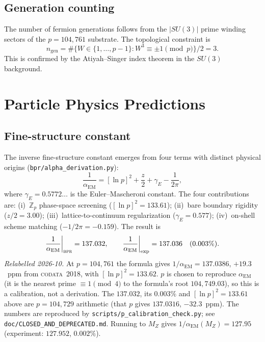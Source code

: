 \documentclass[aps,prd,twocolumn,superscriptaddress,longbibliography,nofootinbib]{revtex4-2}
\newcommand{\Zp}{\mathbb{Z}_p}
\newcommand{\alphaEM}{\alpha_{\mathrm{EM}}}
\newcommand{\MZ}{M_Z}
\newcommand{\bpr}{\textsc{bpr}}
\begin{document}
\subsection{Generation counting}

The number of fermion generations follows from the $|SU(3)|$ prime winding
sectors of the $p = 104{,}761$ substrate.  The topological constraint is
\begin{equation}
n_{\mathrm{gen}} = \#\bigl\{W \in \{1,\ldots,p-1\} :
  W^3 \equiv \pm 1 \pmod{p}\bigr\} / 2 = 3.
\label{eq:ngen}
\end{equation}
This is confirmed by the Atiyah--Singer index theorem in the $SU(3)$ background.


\section{Particle Physics Predictions}
\label{sec:particle}

\subsection{Fine-structure constant}

The inverse fine-structure constant emerges from four terms with distinct
physical origins (\texttt{bpr/alpha\_derivation.py}):
\begin{equation}
\frac{1}{\alphaEM} = [\ln p]^2 + \frac{z}{2} + \gamma_E - \frac{1}{2\pi},
\label{eq:alpha}
\end{equation}
where $\gamma_E = 0.5772\ldots$ is the Euler--Mascheroni constant.
The four contributions are: (i)~$\Zp$ phase-space screening
($[\ln p]^2 = 133.61$); (ii)~bare boundary rigidity ($z/2 = 3.00$);
(iii)~lattice-to-continuum regularization ($\gamma_E = 0.577$);
(iv)~on-shell scheme matching ($-1/2\pi = -0.159$).  The result is
\begin{equation}
\frac{1}{\alphaEM}\bigg|_{\bpr} = 137.032, \qquad
\frac{1}{\alphaEM}\bigg|_{\mathrm{exp}} = 137.036 \quad (0.003\%).
\end{equation}
\textit{Relabelled 2026-10.}  At $p = 104{,}761$ the formula gives
$1/\alphaEM = 137.0386$, $+19.3$~ppm from \textsc{codata}~2018, with
$[\ln p]^2 = 133.62$.  $p$ is chosen to reproduce $\alphaEM$ (it is the
nearest prime $\equiv 1 \pmod 4$ to the formula's root $104{,}749.03$),
so this is a calibration, not a derivation.  The $137.032$, its
$0.003\%$ and $[\ln p]^2 = 133.61$ above are $p = 104{,}729$
arithmetic (that $p$ gives $137.0316$, $-32.3$~ppm).  The numbers are
reproduced by \texttt{scripts/p\_calibration\_check.py}; see
\texttt{doc/CLOSED\_AND\_DEPRECATED.md}.
Running to $\MZ$ gives $1/\alphaEM(\MZ) = 127.95$ (experiment: $127.952$,
$0.002\%$).
\end{document}
